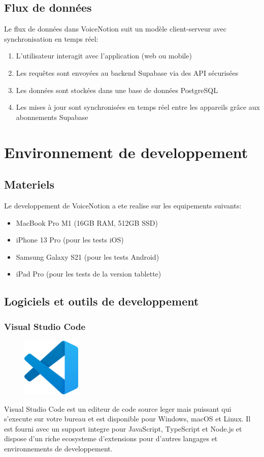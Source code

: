 \subsection{Flux de données}
Le flux de données dans VoiceNotion suit un modèle client-serveur avec synchronisation en temps réel:
\begin{enumerate}
    \item L'utilisateur interagit avec l'application (web ou mobile)
    \item Les requêtes sont envoyées au backend Supabase via des API sécurisées
    \item Les données sont stockées dans une base de données PostgreSQL
    \item Les mises à jour sont synchronisées en temps réel entre les appareils grâce aux abonnements Supabase
\end{enumerate}

\section{Environnement de developpement}
\subsection{Materiels}
Le developpement de VoiceNotion a ete realise sur les equipements suivants:
\begin{itemize}
    \item MacBook Pro M1 (16GB RAM, 512GB SSD)
    \item iPhone 13 Pro (pour les tests iOS)
    \item Samsung Galaxy S21 (pour les tests Android)
    \item iPad Pro (pour les tests de la version tablette)
\end{itemize}

\subsection{Logiciels et outils de developpement}

\subsubsection{Visual Studio Code}
\begin{figure}
    \centering
    \includegraphics[width=0.25\textwidth]{assets/docs/vscode.png}
\end{figure}
Visual Studio Code est un editeur de code source leger mais puissant qui s'execute sur votre bureau et est disponible pour Windows, macOS et Linux. Il est fourni avec un support integre pour JavaScript, TypeScript et Node.js et dispose d'un riche ecosysteme d'extensions pour d'autres langages et environnements de developpement.

